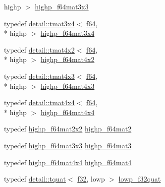 \begin{DoxyCompactItemize}
highp $>$ \hyperlink{group__gtc__type__precision_gaf520a9307867c632408029a53af3e375}{highp\-\_\-f64mat3x3}
\item 
typedef \hyperlink{structglm_1_1detail_1_1tmat3x4}{detail\-::tmat3x4}$<$ \hyperlink{group__gtc__type__precision_ga2bba392e555124b36cde6abba349bab3}{f64}, \\*
highp $>$ \hyperlink{group__gtc__type__precision_ga4144f547189dd7e52b4dd282f41a1cd1}{highp\-\_\-f64mat3x4}
\item 
typedef \hyperlink{structglm_1_1detail_1_1tmat4x2}{detail\-::tmat4x2}$<$ \hyperlink{group__gtc__type__precision_ga2bba392e555124b36cde6abba349bab3}{f64}, \\*
highp $>$ \hyperlink{group__gtc__type__precision_gabe9bc3680e7d83a7b34297da518a8117}{highp\-\_\-f64mat4x2}
\item 
typedef \hyperlink{structglm_1_1detail_1_1tmat4x3}{detail\-::tmat4x3}$<$ \hyperlink{group__gtc__type__precision_ga2bba392e555124b36cde6abba349bab3}{f64}, \\*
highp $>$ \hyperlink{group__gtc__type__precision_ga0264562b4667b8073b7708efc2280691}{highp\-\_\-f64mat4x3}
\item 
typedef \hyperlink{structglm_1_1detail_1_1tmat4x4}{detail\-::tmat4x4}$<$ \hyperlink{group__gtc__type__precision_ga2bba392e555124b36cde6abba349bab3}{f64}, \\*
highp $>$ \hyperlink{group__gtc__type__precision_gaa95b52552df369b75d09155ebb29b1bd}{highp\-\_\-f64mat4x4}
\item 
typedef \hyperlink{group__gtc__type__precision_ga4babca568fc88f185620c02e4fdac0d8}{highp\-\_\-f64mat2x2} \hyperlink{group__gtc__type__precision_ga7d9fd446fd43310ba6f63c8f9468acc0}{highp\-\_\-f64mat2}
\item 
typedef \hyperlink{group__gtc__type__precision_gaf520a9307867c632408029a53af3e375}{highp\-\_\-f64mat3x3} \hyperlink{group__gtc__type__precision_ga00c5743b0eba6b437422571f4eda27b8}{highp\-\_\-f64mat3}
\item 
typedef \hyperlink{group__gtc__type__precision_gaa95b52552df369b75d09155ebb29b1bd}{highp\-\_\-f64mat4x4} \hyperlink{group__gtc__type__precision_ga1ac5d0564721a22765c68c54a0a4f87a}{highp\-\_\-f64mat4}
\item 
typedef \hyperlink{structglm_1_1detail_1_1tquat}{detail\-::tquat}$<$ \hyperlink{group__gtc__type__precision_ga0ec999b57f5330d9021256e96038df04}{f32}, lowp $>$ \hyperlink{group__gtc__type__precision_ga83edc5f21bfa41f72f881b29aabbd919}{lowp\-\_\-f32quat}
\item 

\end{DoxyCompactItemize}
